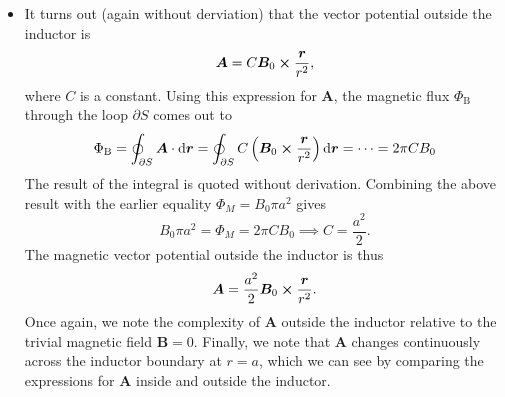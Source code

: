 \documentclass[11pt, a4paper]{article}
\newcommand{\diff}{\mathop{}\!\mathrm{d}} %
\renewcommand{\vec}[1]{\bm{#1}} %
\renewcommand{\r}{\vec{r}}
\newcommand{\B}{\vec{B}} %
\newcommand{\A}{\vec{A}} %
\begin{document}
\begin{itemize}
	\item It turns out (again without derviation) that the vector potential outside the inductor is
	\begin{equation*}
		\A = C \B_{0} \cross \frac{\r}{r^{2}},
	\end{equation*}
	where $ C $ is a constant. Using this expression for $ \A $, the magnetic flux $ \Phi_{\text{B}} $ through the loop $ \partial S $ comes out to
	\begin{equation*}
		\Phi_{\text{B}} = \oint_{\partial S} \A \cdot \diff \r  = \oint_{\partial S} C\left(\B_{0} \cross \frac{\r}{r^{2}}\right) \diff \r = \cdots = 2\pi C B_{0}
	\end{equation*}
	The result of the integral is quoted without derivation. Combining the above result with the earlier equality $ \Phi_{M} = B_{0}\pi a^{2} $ gives
	\begin{equation*}
		B_{0}\pi a^{2} = \Phi_{M} = 2\pi C B_{0} \implies C = \frac{a^{2}}{2}.
	\end{equation*}
	The magnetic vector potential outside the inductor is thus
	\begin{equation*}
		\A = \frac{a^{2}}{2} \B_{0} \cross \frac{\r}{r^{2}}.
	\end{equation*}
    Once again, we note the complexity of $ \A $ outside the inductor relative to the trivial magnetic field $ \B = 0 $. Finally, we note that $ \A $ changes continuously across the inductor boundary at $ r = a $, which we can see by comparing the expressions for $ \A $ inside and outside the inductor.

\end{itemize}
\end{document}
